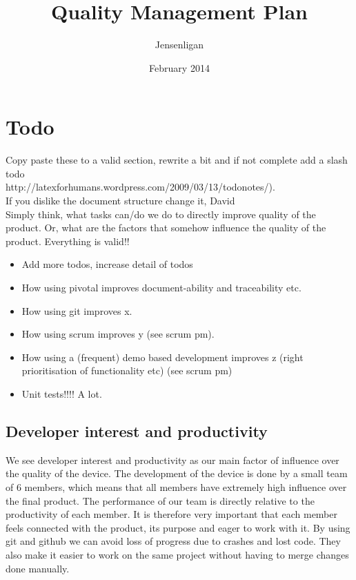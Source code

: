 \documentclass{article}
\title{Quality Management Plan}
\author{Jensenligan}
\date{February 2014}
\begin{document}
\maketitle

\section{Todo}


Copy paste these to a valid section, rewrite a bit and if not complete add a slash todo \\
http://latexforhumans.wordpress.com/2009/03/13/todonotes/).\\If you dislike the document structure change it, David
\\
Simply think, what tasks can/do we do to directly improve quality of the product. Or, what are the factors that somehow influence the quality of the product. Everything is valid!!
\begin{itemize}
\item Add more todos, increase detail of todos
\item How using pivotal improves document-ability and traceability etc.
\item How using git improves x.
\item How using scrum improves y (see scrum pm).
\item How using a (frequent) demo based development improves z (right prioritisation of functionality etc) (see scrum pm)
\item Unit tests!!!! A lot.
\end{itemize}


\subsection{Developer interest and productivity}
We see developer interest and productivity as our main factor of influence over the quality of the device. 
The development of the device is done by a small team of 6 members, which means that all members have extremely high influence over the final product.
The performance of our team is directly relative to the productivity of each member.
It is therefore very important that each member feels connected with the product, its purpose and eager to work with it. 
By using git and github we can avoid loss of progress due to crashes and lost code. They also make it easier to work on the same project without having to merge changes done manually.
\end{document}
